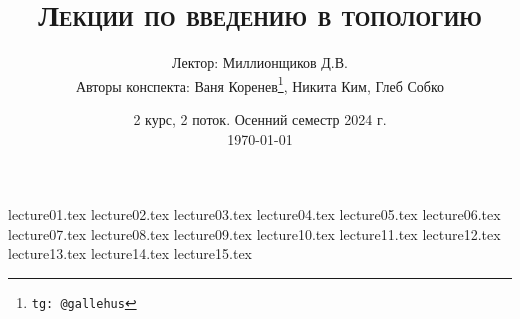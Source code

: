 \documentclass[a4paper]{article}
\title{\scshape {Лекции по введению в топологию}}
\date{2 курс, 2 поток. Осенний семестр 2024 г. \\ \today}
\author{Лектор: Миллионщиков Д.В. \\ Авторы конспекта: Ваня Коренев\thanks{\texttt{tg: @gallehus}}, Никита Ким, Глеб Собко}
\begin{document}
\maketitle
\newpage
\tableofcontents

\newpage

{lecture01.tex}
{lecture02.tex}
{lecture03.tex}
{lecture04.tex}
{lecture05.tex}
{lecture06.tex}
{lecture07.tex}
{lecture08.tex}
{lecture09.tex}
{lecture10.tex}
{lecture11.tex}
{lecture12.tex}
{lecture13.tex}
{lecture14.tex}
{lecture15.tex}
\end{document}
